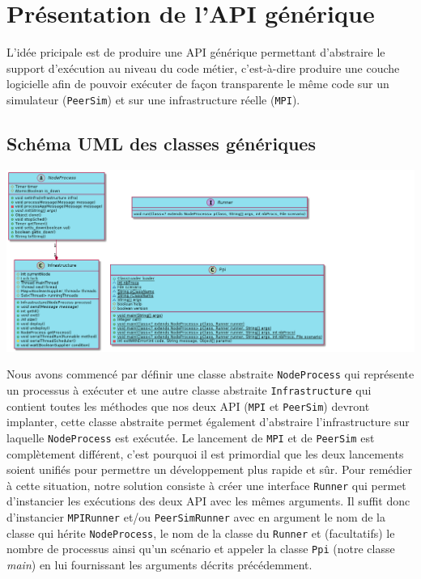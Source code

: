 \documentclass{article}
\begin{document}
		
                
				\newpage
				\section{Présentation de l'API générique}
				L'idée pricipale est de produire une API générique permettant d'abstraire le support d'exécution au niveau du code métier, c'est-à-dire produire une couche logicielle afin de pouvoir exécuter de façon transparente le même code sur un simulateur (\verb|PeerSim|) et sur une infrastructure réelle (\verb|MPI|).					
				\subsection{Schéma UML des classes génériques}
					\vspace{2mm}
					\hspace*{-1cm} \includegraphics[width=22cm]{uml/generique.png}
					
					\vspace{8mm}
					Nous avons commencé par définir une classe abstraite \verb|NodeProcess| qui représente un processus à exécuter et une autre classe abstraite \verb|Infrastructure| qui contient toutes les méthodes que nos deux API (\verb|MPI| et \verb|PeerSim|) devront implanter, cette classe abstraite permet également d'abstraire l'infrastructure sur laquelle \verb|NodeProcess| est exécutée.
					\newline
					\newline
					Le lancement de \verb|MPI| et de \verb|PeerSim| est complètement différent, c’est pourquoi il est primordial que les deux lancements soient unifiés pour permettre un développement plus rapide et sûr. 
					\newline
					Pour remédier à cette situation, notre solution consiste à créer une interface \verb|Runner| qui permet d’instancier les exécutions des deux API avec les mêmes arguments. Il suffit donc d’instancier \verb|MPIRunner| et/ou \verb|PeerSimRunner| avec en argument le nom de la classe qui hérite \verb|NodeProcess|, le nom de la classe du \verb|Runner| et (facultatifs) le nombre de processus ainsi qu’un scénario et appeler la classe \verb|Ppi| (notre classe \emph{main}) en lui fournissant les arguments décrits précédemment.
		
\end{document}
